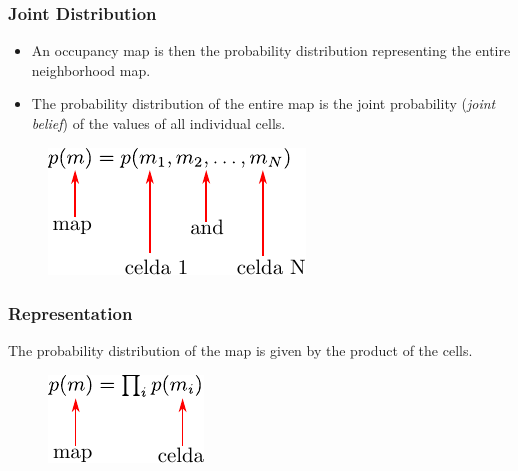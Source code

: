 \begin{frame}
    \frametitle{Joint Distribution}
    
    \begin{itemize}
    \item An occupancy map is then the probability distribution representing the entire neighborhood map.
    
    \item The probability distribution of the entire map is the joint probability (\emph{joint belief}) of the values of all individual cells.
    \end{itemize}
    
    \begin{figure}[!h]
    \includegraphics[width=0.5\columnwidth]{./images/joint_distribution.pdf}
    \end{figure}
    
    \end{frame}
    
    \begin{frame}
    \frametitle{Representation}
    The probability distribution of the map is given by the product of the cells.
    
    \begin{figure}[!h]
    \includegraphics[width=0.3\columnwidth]{./images/map_probability_distribution.pdf}
    \end{figure}
    
    \end{frame}
    

